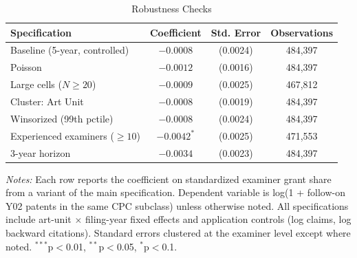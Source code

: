 \begin{table}[htbp]
\centering
\caption{Robustness Checks}
\label{tab:robust}
\begin{tabular}{lccc}
\hline\hline
Specification & Coefficient & Std. Error & Observations \\
\hline
Baseline (5-year, controlled) & $-0.0008$ & (0.0024) & 484,397 \\
Poisson & $-0.0012$ & (0.0016) & 484,397 \\
Large cells ($N \geq 20$) & $-0.0009$ & (0.0025) & 467,812 \\
Cluster: Art Unit & $-0.0008$ & (0.0019) & 484,397 \\
Winsorized (99th pctile) & $-0.0008$ & (0.0024) & 484,397 \\
Experienced examiners ($\geq 10$) & $-0.0042^{*}$ & (0.0025) & 471,553 \\
3-year horizon & $-0.0034$ & (0.0023) & 484,397 \\
\hline\hline
\end{tabular}
\begin{minipage}{0.85\textwidth}
\footnotesize
\textit{Notes:} Each row reports the coefficient on standardized examiner grant share from a variant of the main specification. Dependent variable is log(1 + follow-on Y02 patents in the same CPC subclass) unless otherwise noted. All specifications include art-unit $\times$ filing-year fixed effects and application controls (log claims, log backward citations). Standard errors clustered at the examiner level except where noted.
$^{***}$p$<$0.01, $^{**}$p$<$0.05, $^{*}$p$<$0.1.
\end{minipage}
\end{table}
